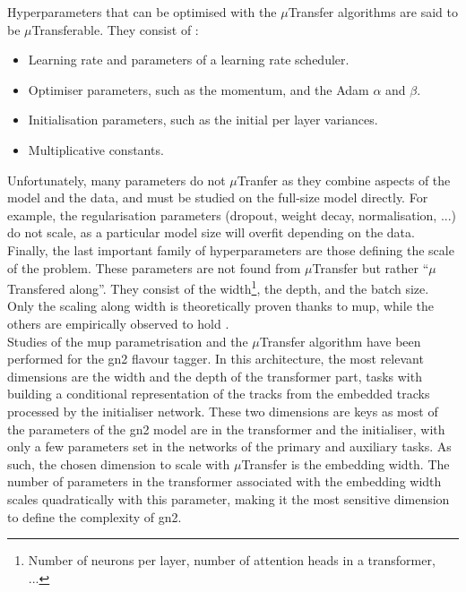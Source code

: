 Hyperparameters that can be optimised with the $\mu$Transfer algorithms are said to be $\mu$Transferable. They consist of \cite{yang2021tuning}: 
\begin{itemize}
  \item Learning rate and parameters of a learning rate scheduler.
  \item Optimiser parameters, such as the momentum, and the Adam $\alpha$ and $\beta$.
  \item Initialisation parameters, such as the initial per layer variances.
  \item Multiplicative constants.
\end{itemize}
Unfortunately, many parameters do not $\mu$Tranfer as they combine aspects of the model and the data, and must be studied on the full-size model directly. For example, the regularisation parameters (dropout, weight decay, normalisation, ...) do not scale, as a particular model size will overfit depending on the data. Finally, the last important family of hyperparameters are those defining the scale of the problem. These parameters are not found from $\mu$Transfer but rather ``$\mu$Transfered along''. They consist of the width\footnote{Number of neurons per layer, number of attention heads in a transformer, ...}, the depth, and the batch size. Only the scaling along width is theoretically proven thanks to \gls{mup}, while the others are empirically observed to hold \cite{yang2021tuning}.\\

Studies of the \gls{mup} parametrisation and the $\mu$Transfer algorithm have been performed for the \gls{gn2} flavour tagger. In this architecture, the most relevant dimensions are the width and the depth of the transformer part, tasks with building a conditional representation of the tracks from the embedded tracks processed by the initialiser network. These two dimensions are keys as most of the parameters of the \gls{gn2} model are in the transformer and the initialiser, with only a few parameters set in the networks of the primary and auxiliary tasks. As such, the chosen dimension to scale with $\mu$Transfer is the embedding width. The number of parameters in the transformer associated with the embedding width scales quadratically with this parameter, making it the most sensitive dimension to define the complexity of \gls{gn2}. 

